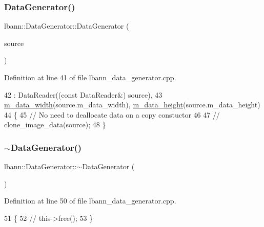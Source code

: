\subsubsection{\texorpdfstring{Data\+Generator()}{DataGenerator()}\hspace{0.1cm}{\footnotesize\ttfamily [2/2]}}
{\footnotesize\ttfamily lbann\+::\+Data\+Generator\+::\+Data\+Generator (\begin{DoxyParamCaption}\item[{const \hyperlink{classlbann_1_1DataGenerator}{Data\+Generator} \&}]{source }\end{DoxyParamCaption})}



Definition at line 41 of file lbann\+\_\+data\+\_\+generator.\+cpp.


\begin{DoxyCode}
42   : DataReader((\textcolor{keyword}{const} DataReader&) source),
43     \hyperlink{classlbann_1_1DataGenerator_a054cb6ab0d93ec57419a81734ddf04aa}{m\_data\_width}(source.m\_data\_width), \hyperlink{classlbann_1_1DataGenerator_a676e679d18eb0523be714345205c662d}{m\_data\_height}(source.m\_data\_height)
44 \{
45   \textcolor{comment}{// No need to deallocate data on a copy constuctor}
46 
47   \textcolor{comment}{//  clone\_image\_data(source);}
48 \}
\end{DoxyCode}
\mbox{\label{classlbann_1_1DataGenerator_a3d524566c15637ca500b6a627904c719}} 
\subsubsection{\texorpdfstring{$\sim$\+Data\+Generator()}{~DataGenerator()}}
{\footnotesize\ttfamily lbann\+::\+Data\+Generator\+::$\sim$\+Data\+Generator (\begin{DoxyParamCaption}{ }\end{DoxyParamCaption})}



Definition at line 50 of file lbann\+\_\+data\+\_\+generator.\+cpp.


\begin{DoxyCode}
51 \{
52   \textcolor{comment}{//  this->free();}
53 \}
\end{DoxyCode}


